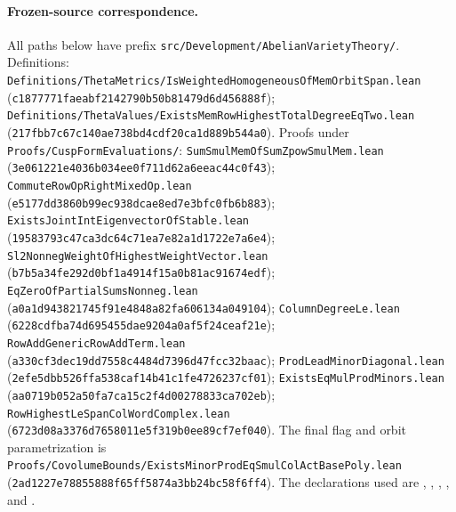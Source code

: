 \paragraph{Frozen-source correspondence.}
All paths below have prefix
\texttt{src/Development/AbelianVarietyTheory/}.
Definitions:
\texttt{Definitions/ThetaMetrics/IsWeightedHomogeneousOfMemOrbitSpan.lean}
(\texttt{c1877771faeabf2142790b50b81479d6d456888f});
\texttt{Definitions/ThetaValues/ExistsMemRowHighestTotalDegreeEqTwo.lean}
(\texttt{217fbb7c67c140ae738bd4cdf20ca1d889b544a0}).
Proofs under \texttt{Proofs/CuspFormEvaluations/}:
\texttt{SumSmulMemOfSumZpowSmulMem.lean}
(\texttt{3e061221e4036b034ee0f711d62a6eeac44c0f43});
\texttt{CommuteRowOpRightMixedOp.lean}
(\texttt{e5177dd3860b99ec938dcae8ed7e3bfc0fb6b883});
\texttt{ExistsJointIntEigenvectorOfStable.lean}
(\texttt{19583793c47ca3dc64c71ea7e82a1d1722e7a6e4});
\texttt{Sl2NonnegWeightOfHighestWeightVector.lean}
(\texttt{b7b5a34fe292d0bf1a4914f15a0b81ac91674edf});
\texttt{EqZeroOfPartialSumsNonneg.lean}
(\texttt{a0a1d943821745f91e4848a82fa606134a049104});
\texttt{ColumnDegreeLe.lean}
(\texttt{6228cdfba74d695455dae9204a0af5f24ceaf21e});
\texttt{RowAddGenericRowAddTerm.lean}
(\texttt{a330cf3dec19dd7558c4484d7396d47fcc32baac});
\texttt{ProdLeadMinorDiagonal.lean}
(\texttt{2efe5dbb526ffa538caf14b41c1fe4726237cf01});
\texttt{ExistsEqMulProdMinors.lean}
(\texttt{aa0719b052a50fa7ca15c2f4d00278833ca702eb});
\texttt{RowHighestLeSpanColWordComplex.lean}
(\texttt{6723d08a3376d7658011e5f319b0ee89cf7ef040}).
The final flag and orbit parametrization is
\texttt{Proofs/CovolumeBounds/ExistsMinorProdEqSmulColActBasePoly.lean}
(\texttt{2ad1227e78855888f65ff5874a3bb24bc58f6ff4}).
The declarations used are
,
,
,
, and
.
